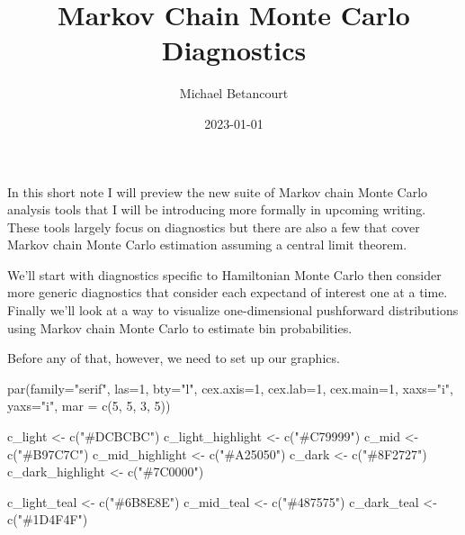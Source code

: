 \documentclass[
  letterpaper,
  DIV=11,
  numbers=noendperiod]{scrartcl}
\title{Markov Chain Monte Carlo Diagnostics}
\author{Michael Betancourt}
\date{2023-01-01}
\newenvironment{Shaded}{\begin{snugshade}}{\end{snugshade}}
\newcommand{\AttributeTok}[1]{\textcolor[rgb]{0.40,0.45,0.13}{#1}}
\newcommand{\DecValTok}[1]{\textcolor[rgb]{0.68,0.00,0.00}{#1}}
\newcommand{\FunctionTok}[1]{\textcolor[rgb]{0.28,0.35,0.67}{#1}}
\newcommand{\NormalTok}[1]{\textcolor[rgb]{0.00,0.23,0.31}{#1}}
\newcommand{\OtherTok}[1]{\textcolor[rgb]{0.00,0.23,0.31}{#1}}
\newcommand{\StringTok}[1]{\textcolor[rgb]{0.13,0.47,0.30}{#1}}
\renewcommand*\contentsname{Table of contents}
\newcommand\contentsname{Table of contents}
\begin{document}
\maketitle

\renewcommand*\contentsname{Table of contents}
{
\hypersetup{linkcolor=}
\setcounter{tocdepth}{3}
\tableofcontents
}
In this short note I will preview the new suite of Markov chain Monte
Carlo analysis tools that I will be introducing more formally in
upcoming writing. These tools largely focus on diagnostics but there are
also a few that cover Markov chain Monte Carlo estimation assuming a
central limit theorem.

We'll start with diagnostics specific to Hamiltonian Monte Carlo then
consider more generic diagnostics that consider each expectand of
interest one at a time. Finally we'll look at a way to visualize
one-dimensional pushforward distributions using Markov chain Monte Carlo
to estimate bin probabilities.

Before any of that, however, we need to set up our graphics.

\begin{Shaded}
\begin{Highlighting}[]
\FunctionTok{par}\NormalTok{(}\AttributeTok{family=}\StringTok{"serif"}\NormalTok{, }\AttributeTok{las=}\DecValTok{1}\NormalTok{, }\AttributeTok{bty=}\StringTok{"l"}\NormalTok{, }\AttributeTok{cex.axis=}\DecValTok{1}\NormalTok{, }\AttributeTok{cex.lab=}\DecValTok{1}\NormalTok{, }\AttributeTok{cex.main=}\DecValTok{1}\NormalTok{,}
    \AttributeTok{xaxs=}\StringTok{"i"}\NormalTok{, }\AttributeTok{yaxs=}\StringTok{"i"}\NormalTok{, }\AttributeTok{mar =} \FunctionTok{c}\NormalTok{(}\DecValTok{5}\NormalTok{, }\DecValTok{5}\NormalTok{, }\DecValTok{3}\NormalTok{, }\DecValTok{5}\NormalTok{))}
  
\NormalTok{c\_light }\OtherTok{\textless{}{-}} \FunctionTok{c}\NormalTok{(}\StringTok{"\#DCBCBC"}\NormalTok{)}
\NormalTok{c\_light\_highlight }\OtherTok{\textless{}{-}} \FunctionTok{c}\NormalTok{(}\StringTok{"\#C79999"}\NormalTok{)}
\NormalTok{c\_mid }\OtherTok{\textless{}{-}} \FunctionTok{c}\NormalTok{(}\StringTok{"\#B97C7C"}\NormalTok{)}
\NormalTok{c\_mid\_highlight }\OtherTok{\textless{}{-}} \FunctionTok{c}\NormalTok{(}\StringTok{"\#A25050"}\NormalTok{)}
\NormalTok{c\_dark }\OtherTok{\textless{}{-}} \FunctionTok{c}\NormalTok{(}\StringTok{"\#8F2727"}\NormalTok{)}
\NormalTok{c\_dark\_highlight }\OtherTok{\textless{}{-}} \FunctionTok{c}\NormalTok{(}\StringTok{"\#7C0000"}\NormalTok{)}

\NormalTok{c\_light\_teal }\OtherTok{\textless{}{-}} \FunctionTok{c}\NormalTok{(}\StringTok{"\#6B8E8E"}\NormalTok{)}
\NormalTok{c\_mid\_teal }\OtherTok{\textless{}{-}} \FunctionTok{c}\NormalTok{(}\StringTok{"\#487575"}\NormalTok{)}
\NormalTok{c\_dark\_teal }\OtherTok{\textless{}{-}} \FunctionTok{c}\NormalTok{(}\StringTok{"\#1D4F4F"}\NormalTok{)}
\end{Highlighting}
\end{Shaded}
\end{document}
